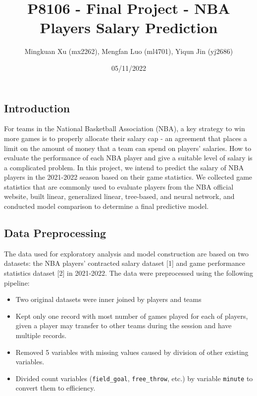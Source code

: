 \documentclass[
]{article}
\title{P8106 - Final Project - NBA Players Salary Prediction}
\author{Mingkuan Xu (mx2262), Mengfan Luo (ml4701), Yiqun Jin (yj2686)}
\date{05/11/2022}
\providecommand{\tightlist}{%
  \setlength{\itemsep}{0pt}\setlength{\parskip}{0pt}}
\begin{document}
\maketitle

\hypertarget{introduction}{%
\subsection{Introduction}\label{introduction}}

For teams in the National Basketball Association (NBA), a key strategy
to win more games is to properly allocate their salary cap - an
agreement that places a limit on the amount of money that a team can
spend on players' salaries. How to evaluate the performance of each NBA
player and give a suitable level of salary is a complicated problem. In
this project, we intend to predict the salary of NBA players in the
2021-2022 season based on their game statistics. We collected game
statistics that are commonly used to evaluate players from the NBA
official website, built linear, generalized linear, tree-based, and
neural network, and conducted model comparison to determine a final
predictive model.

\hypertarget{data-preprocessing}{%
\subsection{Data Preprocessing}\label{data-preprocessing}}

The data used for exploratory analysis and model construction are based
on two datasets: the NBA players' contracted salary dataset {[}1{]} and
game performance statistics dataset {[}2{]} in 2021-2022. The data were
preprocessed using the following pipeline:

\begin{itemize}
\tightlist
\item
  Two original datasets were inner joined by players and teams
\item
  Kept only one record with most number of games played for each of
  players, given a player may transfer to other teams during the session
  and have multiple records.
\item
  Removed 5 variables with missing values caused by division of other
  existing variables.
\item
  Divided count variables (\texttt{field\_goal}, \texttt{free\_throw},
  etc.) by variable \texttt{minute} to convert them to efficiency.
\end{itemize}
\end{document}
